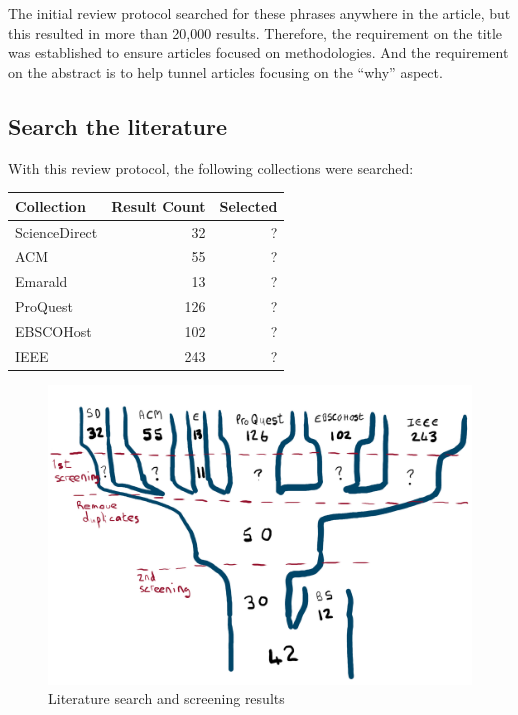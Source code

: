 The initial review protocol searched for these phrases anywhere in the article, but this resulted in more than 20,000 results.
Therefore, the requirement on the title was established to ensure articles focused on methodologies.
And the requirement on the abstract is to help tunnel articles focusing on the ``why'' aspect.

\subsection{Search the literature}
With this review protocol, the following collections were searched:

\begin{table}[H]
\begin{tabular}{ |l|r|r| }
  \hline
  Collection & Result Count & Selected \\
  \hline
  ScienceDirect & 32 & ? \\
  ACM & 55 & ? \\
  Emarald & 13 & ? \\
  ProQuest & 126 & ? \\
  EBSCOHost & 102 & ? \\
  IEEE & 243 & ? \\
  \hline
\end{tabular}
\label{table:search_lit}
\end{table}

\begin{figure}[H]
\includegraphics[width=\textwidth]{why_methodologies_exist/sankey}
\caption{Literature search and screening results}
\label{fig:search_lit}
\end{figure}

